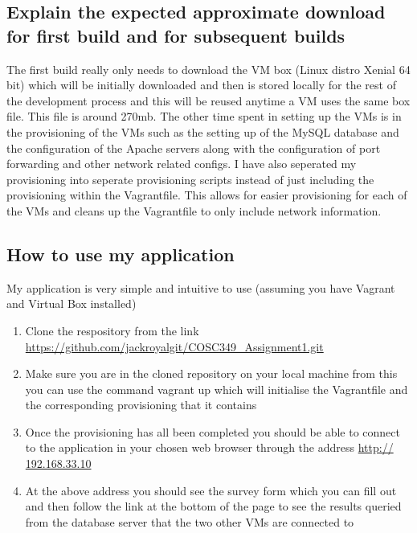\documentclass[12pt, article, oneside]{article}
\begin{document}
\subsection{Explain the expected approximate download for first build and for subsequent builds}
The first build really only needs to download the VM box (Linux distro Xenial 64 bit) which will be initially downloaded and then is stored locally for the rest of the development process and this will be reused anytime a VM uses the same box file. This file is around 270mb. The other time spent in setting up the VMs is in the provisioning of the VMs such as the setting up of the MySQL database and the configuration of the Apache servers along with the configuration of port forwarding and other network related configs. I have also seperated my provisioning into seperate provisioning scripts instead of just including the provisioning within the Vagrantfile. This allows for easier provisioning for each of the VMs and cleans up the Vagrantfile to only include network information.

\subsection{How to use my application}
My application is very simple and intuitive to use (assuming you have Vagrant and Virtual Box installed)
\begin{enumerate}
	\item Clone the respository from the link \url{https://github.com/jackroyalgit/COSC349_Assignment1.git}
	\item Make sure you are in the cloned repository on your local machine from this you can use the command vagrant up which will initialise the Vagrantfile and the corresponding provisioning that it contains
	\item Once the provisioning has all been completed you should be able to connect to the application in your chosen web browser through the address \url{http:// 192.168.33.10}
	\item At the above address you should see the survey form which you can fill out and then follow the link at the bottom of the page to see the results queried from the database server that the two other VMs are connected to 
\end{enumerate}
\end{document}
